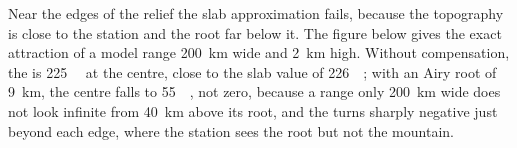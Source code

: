 Near the edges of the relief the slab approximation fails, because the
topography is close to the station and the root far below it. The figure below
gives the exact attraction of a model range \qty{200}{km} wide and \qty{2}{km}
high. Without compensation, the  is
\qty{+225}{\milli\gal} at the centre, close to the slab value of
\qty{226}{\milli\gal}; with an Airy root of \qty{9}{km}, the centre  falls to \qty{+55}{\milli\gal}, not zero, because a range only
\qty{200}{km} wide does not look infinite from \qty{40}{km} above its root, and
the  turns sharply negative just beyond each edge, where the
station sees the root but not the mountain.

